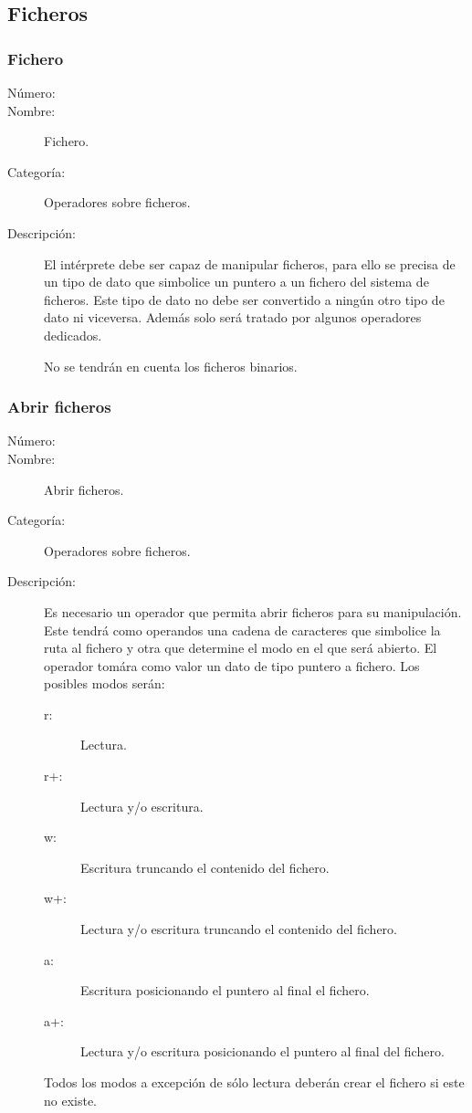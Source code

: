 \subsection{Ficheros}
\subsubsection{Fichero}
\begin{framed}
	\begin{description}
		\item [Número:] \cn
		\item [Nombre:] Fichero.
		\item [Categoría:] Operadores sobre ficheros.
		\item [Descripción:] El intérprete debe ser capaz de manipular ficheros, para ello se precisa de un tipo de dato
		que simbolice un puntero a un fichero del sistema de ficheros. Este tipo de dato no debe ser convertido a ningún otro
		tipo de dato ni viceversa. Además solo será tratado por algunos operadores dedicados. 
		
		No se tendrán en cuenta los  ficheros binarios.
	\end{description}
\end{framed}

\subsubsection{Abrir ficheros}
\begin{framed}
	\begin{description}
		\item [Número:] \cn
		\item [Nombre:] Abrir ficheros.
		\item [Categoría:] Operadores sobre ficheros.
		\item [Descripción:] Es necesario un operador que permita abrir ficheros para su manipulación. Este tendrá como operandos
		una cadena de caracteres que simbolice la ruta al fichero y otra que determine el modo en el que será abierto. El operador 
		tomára como valor un dato de tipo puntero a fichero. Los posibles modos serán:
		
		\begin{description}
			\item [r:] Lectura.
			\item [r+:] Lectura y/o escritura.
			\item [w:] Escritura truncando el contenido del fichero.
			\item [w+:] Lectura y/o escritura truncando el contenido del fichero.
			\item [a:] Escritura posicionando el puntero al final el fichero.
			\item [a+:] Lectura y/o escritura posicionando el puntero al final del fichero.
		\end{description}
		
		Todos los modos a excepción de sólo lectura deberán crear el fichero si este no existe.  
	\end {description}
\end{framed}

